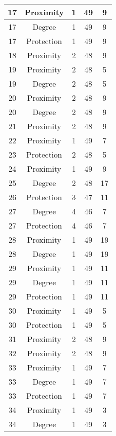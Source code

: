 \documentclass[results.tex]{subfiles}
\begin{document}
\begin{center}
\begin{tabular}{| c || c | c | c | c |}
    \hline
    17 & Proximity & 1 & 49 & 9 \\ 
    \hline
    17 & Degree & 1 & 49 & 9 \\ 
    \hline
    17 & Protection & 1 & 49 & 9 \\ 
    \hline
    18 & Proximity & 2 & 48 & 9 \\ 
    \hline
    19 & Proximity & 2 & 48 & 5 \\ 
    \hline
    19 & Degree & 2 & 48 & 5 \\ 
    \hline
    20 & Proximity & 2 & 48 & 9 \\ 
    \hline
    20 & Degree & 2 & 48 & 9 \\ 
    \hline
    21 & Proximity & 2 & 48 & 9 \\ 
    \hline
    22 & Proximity & 1 & 49 & 7 \\ 
    \hline
    23 & Protection & 2 & 48 & 5 \\ 
    \hline
    24 & Proximity & 1 & 49 & 9 \\ 
    \hline
    25 & Degree & 2 & 48 & 17 \\ 
    \hline
    26 & Protection & 3 & 47 & 11 \\ 
    \hline
    27 & Degree & 4 & 46 & 7 \\ 
    \hline
    27 & Protection & 4 & 46 & 7 \\ 
    \hline
    28 & Proximity & 1 & 49 & 19 \\ 
    \hline
    28 & Degree & 1 & 49 & 19 \\ 
    \hline
    29 & Proximity & 1 & 49 & 11 \\ 
    \hline
    29 & Degree & 1 & 49 & 11 \\ 
    \hline
    29 & Protection & 1 & 49 & 11 \\ 
    \hline
    30 & Proximity & 1 & 49 & 5 \\ 
    \hline
    30 & Protection & 1 & 49 & 5 \\ 
    \hline
    31 & Proximity & 2 & 48 & 9 \\ 
    \hline
    32 & Proximity & 2 & 48 & 9 \\ 
    \hline
    33 & Proximity & 1 & 49 & 7 \\ 
    \hline
    33 & Degree & 1 & 49 & 7 \\ 
    \hline
    33 & Protection & 1 & 49 & 7 \\ 
    \hline
    34 & Proximity & 1 & 49 & 3 \\ 
    \hline
    34 & Degree & 1 & 49 & 3 \\ 
    \hline

\end{tabular}
\end{center}
\end{document}
